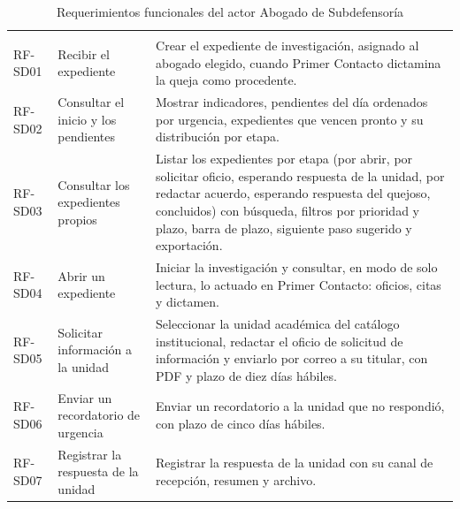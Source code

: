	\begin{longtable}{|p{1.5cm}|p{3.6cm}|p{9.0cm}|}
		\caption{Requerimientos funcionales del actor Abogado de Subdefensoría}
		\label{tab:rf_sd} \\
		\hline
		\rowcolor{headerblue}
		\headercell{ID} & \headercell{Requerimiento} & \headercell{Descripción} \\
		\hline
		\endfirsthead

		\hline
		\rowcolor{headerblue}
		\headercell{ID} & \headercell{Requerimiento} & \headercell{Descripción} \\
		\hline
		\endhead

		RF-SD01 & Recibir el expediente & Crear el expediente de investigación, asignado al abogado
		elegido, cuando Primer Contacto dictamina la queja como procedente. \\ \hline

		RF-SD02 & Consultar el inicio y los pendientes & Mostrar indicadores, pendientes del día
		ordenados por urgencia, expedientes que vencen pronto y su distribución por etapa. \\ \hline

		RF-SD03 & Consultar los expedientes propios & Listar los expedientes por etapa (por abrir, por
		solicitar oficio, esperando respuesta de la unidad, por redactar acuerdo, esperando respuesta
		del quejoso, concluidos) con búsqueda, filtros por prioridad y plazo, barra de plazo, siguiente
		paso sugerido y exportación. \\ \hline

		RF-SD04 & Abrir un expediente & Iniciar la investigación y consultar, en modo de solo lectura,
		lo actuado en Primer Contacto: oficios, citas y dictamen. \\ \hline

		RF-SD05 & Solicitar información a la unidad & Seleccionar la unidad académica del catálogo
		institucional, redactar el oficio de solicitud de información y enviarlo por correo a su
		titular, con PDF y plazo de diez días hábiles. \\ \hline

		RF-SD06 & Enviar un recordatorio de urgencia & Enviar un recordatorio a la unidad que no
		respondió, con plazo de cinco días hábiles. \\ \hline

		RF-SD07 & Registrar la respuesta de la unidad & Registrar la respuesta de la unidad con su canal
		de recepción, resumen y archivo. \\ \hline


\end{longtable}
